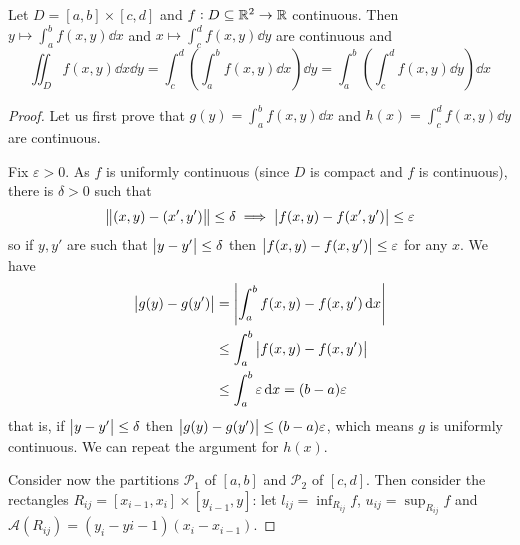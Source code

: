 \documentclass[12pt]{extarticle}
\begin{document}
\begin{theorem}
    Let $D = [a, b] \times [c, d]$ and $f: D \subseteq \mathbb{R}^2 \to \mathbb{R}$ continuous.
    Then $y \mapsto \int_a^b f(x, y) \dd{x}$ and $x \mapsto \int_c^d f(x, y) \dd{y}$ are continuous and
    \begin{equation}
        \iint_D f(x, y) \dd{x}\dd{y} = \int_c^d \left(\int_a^b f(x,y) \dd{x}\right) \dd{y} = \int_a^b \left(\int_c^d f(x,y) \dd{y}\right) \dd{x}
    \end{equation}
\end{theorem}
\begin{proof}
    Let us first prove that $g(y) = \int_a^b f(x, y) \dd{x}$ and $h(x) = \int_c^d f(x, y) \dd{y}$ are continuous.

    Fix $\varepsilon > 0$. As $f$ is uniformly continuous (since $D$ is compact and $f$ is continuous), there is $\delta > 0$ such that
    \begin{equation}
        \norm{(x,y)- (x',y')} \leq \delta \implies \abs{f(x, y) - f(x', y')} \leq \varepsilon
    \end{equation}
    so if $y, y'$ are such that $\abs{y-y'} \leq \delta$ then $\abs{f(x,y) - f(x,y')} \leq \varepsilon$ for any $x$.
    We have
    \begin{align}
        \abs{g(y) - g(y')} & = \abs{\int_a^b f(x,y) - f(x,y') \dd{x}}             \\
                           & \leq \int_a^b \abs{f(x, y) - f(x, y')}               \\
                           & \leq \int_a^b \varepsilon \dd{x} = (b-a) \varepsilon
    \end{align}
    that is, if $\abs{y-y'} \leq \delta$ then $\abs{g(y) - g(y')} \leq (b-a)\varepsilon$, which means $g$ is uniformly continuous.
    We can repeat the argument for $h(x)$.

    Consider now the partitions $\mathcal P_1$ of $[a, b]$ and $\mathcal P_2$ of $[c, d]$.
    Then consider the rectangles $R_{ij} = [x_{i-1}, x_i] \times [y_{i-1}, y]$: let $l_{ij} = \inf_{R_{ij}} f$, $u_{ij} = \sup_{R_{ij}} f$ and $\mathcal A(R_{ij}) = (y_i -y{i-1}) (x_i - x_{i-1})$.


\end{proof}
\end{document}
